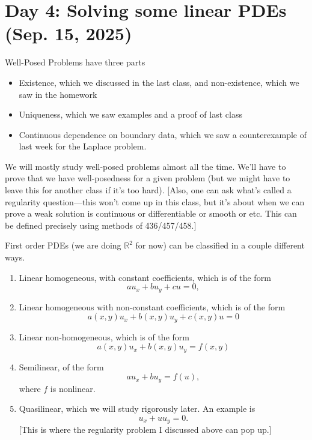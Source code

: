 \section{Day 4: Solving some linear PDEs (Sep. 15, 2025)}
Well-Posed Problems have three parts
\begin{itemize}

	\item Existence, which we discussed in the last class, and non-existence, which we saw in the homework
	\item Uniqueness, which we saw examples and a proof of last class
	\item Continuous dependence on boundary data, which we saw a counterexample of last week for the Laplace problem.
	

\end{itemize}
We will mostly study well-posed problems almost all the time. We'll have to prove that we have well-posedness for a given problem (but we might have to leave this for another class if it's too hard). [Also, one can ask what's called a regularity question---this won't come up in this class, but it's about when we can prove a weak solution is continuous or differentiable or smooth or etc. This can be defined precisely using methods of 436/457/458.]

First order PDEs (we are doing \( \mathbb{R}^{2} \) for now) can be classified in a couple different ways.
\begin{enumerate}

	\item Linear homogeneous, with constant coefficients, which is of the form
		\[ au_{x} + bu_{y} + cu = 0, \]
	\item Linear homogeneous with non-constant coefficients, which is of the form
		\[ a(x, y) u_{x} + b(x, y)u_{y} + c(x, y)u = 0 \]
	\item Linear non-homogeneous, which is of the form
		\[ a(x, y) u_{x} + b(x, y)u_{y} = f(x, y) \]
	\item Semilinear, of the form
		\[ a u_{x} + b u_{y} = f(u), \]
		where \( f \) is nonlinear.
	\item Quasilinear, which we will study rigorously later. An example is
		\[ u_{x} + u u_{y} = 0. \]
		[This is where the regularity problem I discussed above can pop up.] 
\end{enumerate}


